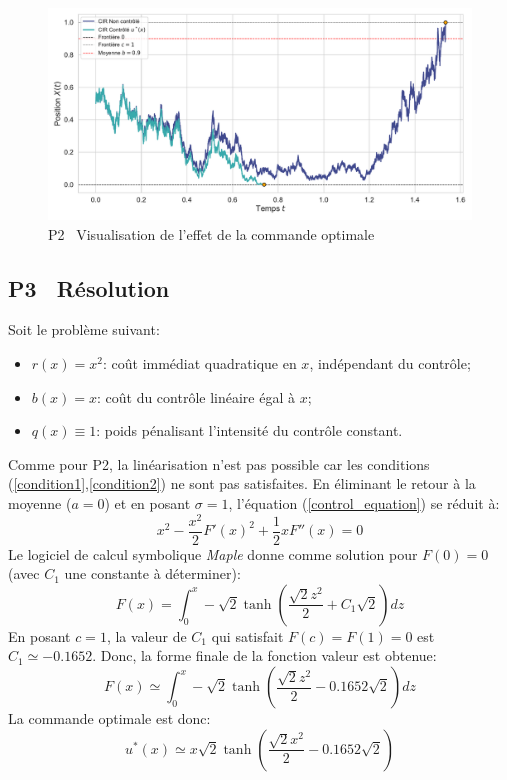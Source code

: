 \begin{figure}[htb]
    \centering
    \includegraphics[width=0.9\linewidth]{img/validation/P2/p2_control_simulation.pdf}
    \caption{P2 \textemdash~Visualisation de l'effet de la commande optimale}\label{fig:Simulation2}
\end{figure}\FloatBarrier\subsection{P3 \textemdash~Résolution}\label{p3}
Soit le problème suivant:
\begin{itemize}
    \item $r(x) = x^2$: coût immédiat quadratique en $x$, indépendant du contrôle;
    \item $b(x) = x$: coût du contrôle linéaire égal à $x$;
    \item $q(x) \equiv 1$: poids pénalisant l'intensité du contrôle constant.
\end{itemize}
Comme pour P2, la linéarisation n'est pas possible car les conditions (\ref{condition1},\ref{condition2}) ne sont pas satisfaites. En éliminant le retour à la moyenne ($a=0$) et en posant $\sigma=1$, l'équation (\ref{control_equation}) se réduit à:
\[
    x^2-\frac{x^2}{2}{F'(x)}^2+\frac{1}{2}xF''(x)=0
\]
Le logiciel de calcul symbolique \textit{Maple} donne comme solution pour $F(0)=0$ (avec $C_1$ une constante à déterminer):
\[
    F(x)=\int_0^x-\sqrt{2}\tanh\left(\frac{\sqrt{2}z^2}{2}+C_1\sqrt{2}\right)dz
\]
En posant $c=1$, la valeur de $C_1$ qui satisfait $F(c)=F(1)=0$ est $C_1\simeq -0.1652$. Donc, la forme finale de la fonction valeur est obtenue:
\begin{equation}\label{sol_control_3}
    F(x)\simeq \int_0^x-\sqrt{2}\tanh\left(\frac{\sqrt{2}z^2}{2}-0.1652\sqrt{2}\right)dz
\end{equation}
La commande optimale est donc:
\begin{equation}\label{optimal_control_3}
    u^*(x)\simeq x\sqrt{2}\tanh\left(\frac{\sqrt{2}x^2}{2}-0.1652\sqrt{2}\right)
\end{equation}
